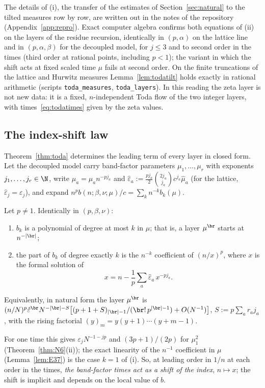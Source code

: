 The details of (i), the transfer of the estimates of Section~\ref{sec:natural} to the tilted measures row by row, are written out in the notes of the
repository (Appendix~\ref{app:repro}). Exact computer algebra confirms both equations of (ii) on the layers of the residue recursion,
identically in $(p,\alpha)$ on the lattice line and in $(p,\alpha,\beta)$ for the decoupled model, for $j\le3$ and to second order in
the times (third order at rational points, including $p<1$); the variant in which the shift acts at fixed scaled time $\mu$ fails at
second order. On the finite truncations of the lattice and Hurwitz measures Lemma~\ref{lem:todatilt} holds exactly in rational
arithmetic (scripts \texttt{toda\_measures}, \texttt{toda\_layers}). In this reading the zeta layer is not new data: it is a fixed, $n$-independent Toda flow of the two integer
layers, with times~\eqref{eq:todatimes} given by the zeta values.

\subsection{The index-shift law}\label{sec:indexshift}
Theorem~\ref{thm:toda} determines the leading term of every layer in closed form. Let the decoupled model carry band-factor
parameters $\mu_1,\dots,\mu_r$ with exponents $j_1,\dots,j_r\in\N$, write $\mu_a=\hat\mu_an^{-pj_a}$ and
$\hat\varepsilon_a:=\frac{pj_a}2\binom{2j_a}{j_a}c^{j_a}\hat\mu_a$ (for the lattice, $\hat\varepsilon_j=\varepsilon_j$), and expand
$n^pb(n;\beta,\nu;\mu)/c=\sum_kn^{-k}b_k(\mu)$.

\begin{theorem}\label{thm:indexshift}
Let $p\ne1$. Identically in $(p,\beta,\nu)$:
\begin{enumerate}
\item[(i)] $b_k$ is a polynomial of degree at most $k$ in $\mu$; that is, a layer $\mu^{\br}$ starts at $n^{-|\br|}$;
\item[(ii)] the part of $b_k$ of degree exactly $k$ is the $n^{-k}$ coefficient of $(n/x)^p$, where $x$ is the formal solution of
\[
  x=n-\frac1p\sum_a\hat\varepsilon_a\,x^{-pj_a}.
\]
\end{enumerate}
Equivalently, in natural form the layer $\mu^{\br}$ is
$(n/N)^p\hat\varepsilon^{\br}N^{-|\br|-S}\bigl[(p+1+S)_{|\br|-1}/(\br!\,p^{|\br|-1})+O(N^{-1})\bigr]$, $S:=p\sum_ar_aj_a$, with the
rising factorial $(y)_m=y(y+1)\cdots(y+m-1)$.
\end{theorem}

For one time this gives $\varepsilon_jN^{-1-jp}$ and $(3p+1)/(2p)$ for $\mu_1^2$ (Theorem~\ref{thm:N6}(ii)); the exact linearity of the
$n^{-1}$ coefficient in $\mu$ (Lemma~\ref{lem:E37}) is the case $k=1$ of (i). So, at leading order in $1/n$ at each order in the times,
\emph{the band-factor times act as a shift of the index}, $n\mapsto x$; the shift is implicit and depends on the local value of $b$.

